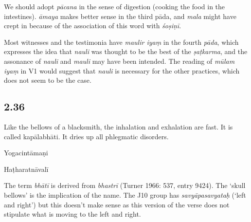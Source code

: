 \begin{ekdosis}
\begin{philcomm}[hp02_035]
We should adopt \emph{pācana} in the sense of digestion (cooking the food in the intestines). \emph{āmaya} makes better sense in the third pāda, and \emph{mala} might have crept in because of the association of this word with \emph{śoṣiṇī}. 

Most witnesses and the testimonia have \emph{maulir iyaṃ} in the fourth \emph{pāda}, which expresses the idea that \emph{nauli} was thought to be the best of the \emph{ṣaṭkarma}, and the assonance of \emph{nauli} and \emph{mauli} may have been intended. The reading of \emph{mūlam iyaṃ} in V1 would suggest that \emph{nauli} is necessary for the other practices, which does not seem to be the case.
\end{philcomm}

\subsection*{2.36}
\begin{translation}[hp02_036]
Like the bellows of a blacksmith, the inhalation and exhalation are fast. It is called kapālabhāti. It dries up all phlegmatic disorders.
\end{translation}

\begin{sources}[hp02_036]
\end{sources}

\begin{testimonia}[hp02_036]
Yogacintāmaṇi

\begin{versinnote}
\end{versinnote}

Haṭharatnāvalī

\begin{versinnote}
\end{versinnote}
\end{testimonia}

\begin{philcomm}[hp02_036]
The term \emph{bhātī} is derived from \emph{bhastrī} (Turner 1966: 537, entry 9424). The ‘skull bellows’ is the implication of the name. The J10 group has \emph{savyāpasavyataḥ} (‘left and right’) but this doesn’t make sense as this version of the verse does not stipulate what is moving to the left and right.
\end{philcomm}


\end{ekdosis}
